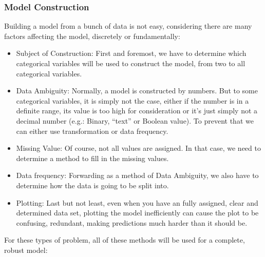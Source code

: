 \documentclass[a4paper]{article}
\numberwithin{equation}{section}
\begin{document}
\subsubsection{Model Construction}

Building a model from a bunch of data is not easy, considering there are many factors affecting the model, discretely or fundamentally:

\begin{itemize}
  \item Subject of Construction: First and foremost, we have to determine which categorical variables will be used to construct the model, from two to all categorical variables.
  \item Data Ambiguity: Normally, a model is constructed by numbers.
        But to some categorical variables, it is simply not the case, either if the number is in a definite range, its value is too high for consideration or it's just simply not a decimal number (e.g.: Binary, ``text'' or Boolean value).
        To prevent that we can either use transformation or data frequency.
  \item Missing Value: Of course, not all values are assigned.
        In that case, we need to determine a method to fill in the missing values.
  \item Data frequency: Forwarding as a method of Data Ambiguity, we also have to determine how the data is going to be split into.
  \item Plotting: Last but not least, even when you have an fully assigned, clear and determined data set, plotting the model inefficiently can cause the plot to be confusing, redundant, making predictions much harder than it should be.
\end{itemize}

For these types of problem, all of these methods will be used for a complete, robust model:
\end{document}
